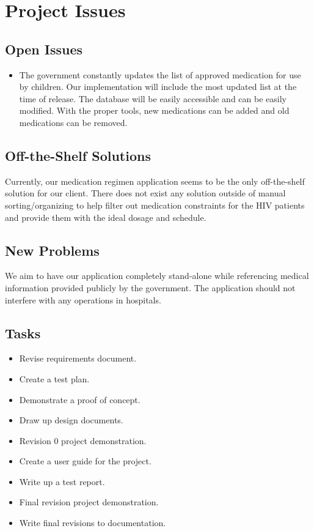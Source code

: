 \documentclass[12pt]{article}
\begin{document}
\section{Project Issues}
\setcounter{subsection}{17}
\subsection{Open Issues}
\begin{itemize}
\item The government constantly updates the list of approved medication for use by children. Our implementation will include the most updated list at the time of release. The database will be easily accessible and can be easily modified. With the proper tools, new medications can be added and old medications can be removed. 
\end{itemize}

\subsection{Off-the-Shelf Solutions }
Currently, our medication regimen application seems to be the only off-the-shelf solution for our client. There does not exist any solution outside of manual sorting/organizing to help filter out medication constraints for the HIV patients and provide them with the ideal dosage and schedule.

\subsection{New Problems }
We aim to have our application completely stand-alone while referencing medical information provided publicly by the government. The application should not interfere with any operations in hospitals.

\subsection{Tasks}
\begin{itemize}
\item Revise requirements document.
\item Create a test plan.
\item Demonstrate a proof of concept.
\item Draw up design documents.
\item Revision 0 project demonstration.
\item Create a user guide for the project.
\item Write up a test report.
\item Final revision project demonstration.
\item Write final revisions to documentation.
\end{itemize}
\end{document}
